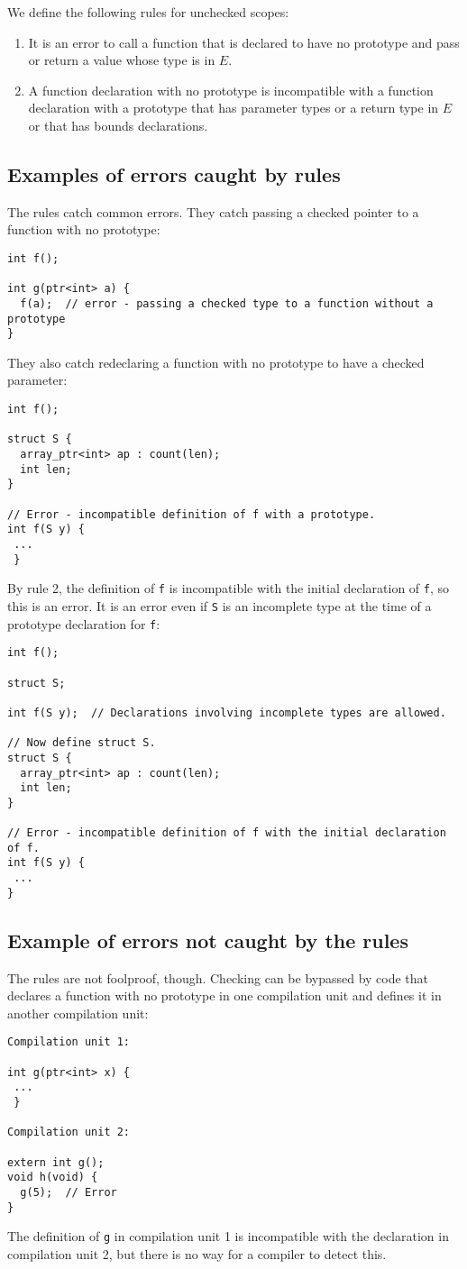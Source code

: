 We define the following rules for unchecked scopes:
\begin{enumerate}
\item It is an error to call a function that is
declared to have no prototype and pass or return a value whose type is in $E$.
\item A function declaration with no prototype is incompatible with a function declaration
with a prototype that has parameter types or a return type in $E$ or that has bounds
declarations.
\end{enumerate}

\subsection{Examples of errors caught by rules}
The rules catch common errors.  They catch passing a checked pointer
to a function with no prototype:
\begin{verbatim}
int f();

int g(ptr<int> a) {
  f(a);  // error - passing a checked type to a function without a prototype
}
\end{verbatim}
They also catch redeclaring a function with no prototype to have a checked parameter:
\begin{verbatim}
int f();

struct S {
  array_ptr<int> ap : count(len);
  int len;
}

// Error - incompatible definition of f with a prototype.
int f(S y) {
 ...
 }
\end{verbatim}
By rule 2, the definition of \verb+f+ is incompatible with the initial
declaration of \verb+f+, so this is an error.  It is an error even
if \verb+S+ is an incomplete type at the time of
a prototype declaration for \verb+f+:
\begin{verbatim} 
int f();

struct S;

int f(S y);  // Declarations involving incomplete types are allowed.

// Now define struct S.
struct S {
  array_ptr<int> ap : count(len);
  int len;
}

// Error - incompatible definition of f with the initial declaration of f.
int f(S y) {
 ...
}
\end{verbatim}

\subsection{Example of errors not caught by the rules}
The rules are not foolproof, though. Checking can be bypassed by code that
declares a function with no prototype in one
compilation unit and defines it in another compilation unit:
\begin{verbatim}
Compilation unit 1:

int g(ptr<int> x) {
 ...
 }

Compilation unit 2:

extern int g();
void h(void) {
  g(5);  // Error
}
\end{verbatim}
The definition of \verb+g+ in compilation unit 1 is incompatible with
the declaration in compilation unit 2, but there is no way for a compiler
to detect this.


